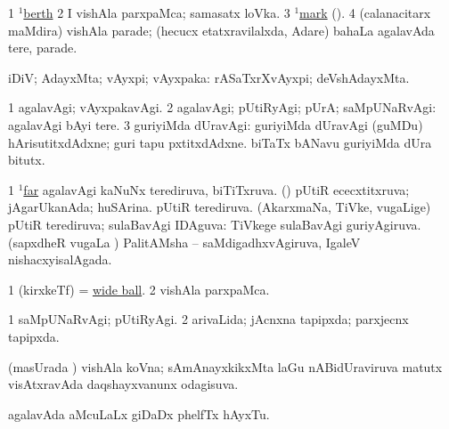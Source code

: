 \noindent 
\gl{\pagu}
\bmng
\bnum
\num{1}  \hyperref{kandict_b.pdf}{B}{berth(1) pagu(1)}{$^1$berth}  
\num{2}  I vishAla parxpaMca; samasatx loVka. 
\num{3}  \hyperref{kandict_m.pdf}{M}{mark(1) pagu(17)}{$^1$mark} (\pagu {}). 
\num{4}  (calanacitarx maMdira) vishAla parade; (hecucx etatxravilalxda, Adare) bahaLa agalavAda tere, parade. 
\enum
\emng
\eentry

\bentry
{} 
\gl{\saupa}
\bmng
iDiV; AdayxMta; vAyxpi; vAyxpaka:  rASaTxrXvAyxpi; deVshAdayxMta. 
\emng
\eentry

\bentry
{} 
\gl{\kirxvi}
\expl{}
\bmng
\bnum
\num{1} agalavAgi; vAyxpakavAgi. 
\num{2} agalavAgi; pUtiRyAgi; pUrA; saMpUNaRvAgi:  agalavAgi bAyi tere. 
\num{3} guriyiMda dUravAgi:  guriyiMda dUravAgi (guMDu) hArisutitxdAdxne; guri tapu pxtitxdAdxne.  biTaTx bANavu guriyiMda dUra bitutx. 
\enum
\emng

\noindent 
\gl{\pagu}
\bmng
\bnum
\num{1} \hyperref{kandict_f.pdf}{F}{far(1) nuga(4)}{$^1$far}  
  
\banum
{} agalavAgi kaNuNx terediruva, biTiTxruva. 
 (\AmA) pUtiR ececxtitxruva; jAgarUkanAda; huSArina. 
\eanum
\numie
{}  
\banum
{} pUtiR terediruva. 
 (AkarxmaNa, TiVke, \mo vugaLige) pUtiR terediruva; sulaBavAgi IDAguva:  TiVkege sulaBavAgi guriyAgiruva. 
 (sapxdheR \mo vugaLa \vi) PalitAMsha -- saMdigadhxvAgiruva, IgaleV nishacxyisalAgada. 
\eanum
\numie
\enum
\emng
\eentry

\bentry
{} 
\gl{\nA}
\expl{}
\bmng
\bnum
\num{1} (kirxkeTf) = \hyperlink{wide ball}{wide ball}. 
\num{2}  vishAla parxpaMca. 
\enum
\emng

\noindent 
\gl{\pagu}
\bmng
\bnum
\num{1}  saMpUNaRvAgi; pUtiRyAgi. 
\num{2}  arivaLida; jAcnxna tapipxda; parxjecnx tapipxda. 
\enum
\emng
\eentry

\bentry
{} 
\gl{\gu}
\expl{}
\bmng
(masUrada \vi) vishAla koVna; sAmAnayxkikxMta laGu nABidUraviruva matutx visAtxravAda daqshayxvanunx odagisuva. 
\emng
\eentry

\bentry
{}
\gl{\nA}
\bmng
agalavAda aMcuLaLx giDaDx phelfTx hAyxTu. 
\emng
\eentry

